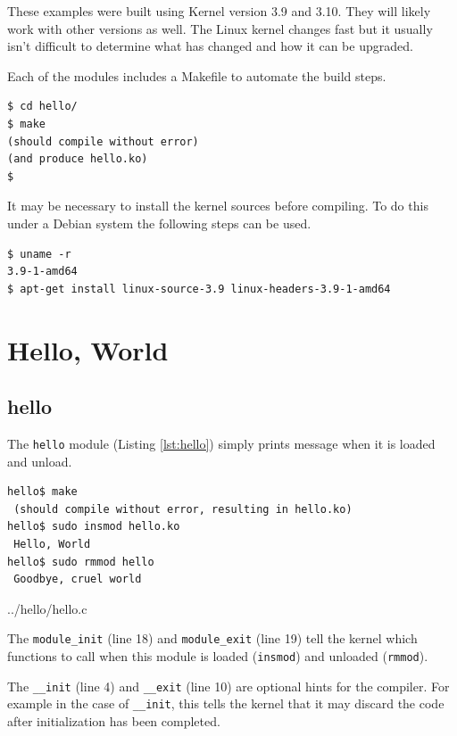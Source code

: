 \documentclass{article}
\begin{document}
These examples were built using Kernel version 3.9 and 3.10.
They will likely work with other versions as well.
The Linux kernel changes fast but it usually isn't difficult to
determine what has changed and how it can be upgraded.

Each of the modules includes a Makefile to automate the build steps.

\begin{verbatim}
$ cd hello/
$ make
(should compile without error)
(and produce hello.ko)
$
\end{verbatim}

It may be necessary to install the kernel sources before compiling.
To do this under a Debian\autocite{debian} system the following steps
can be used.

\begin{verbatim}
$ uname -r
3.9-1-amd64
$ apt-get install linux-source-3.9 linux-headers-3.9-1-amd64

\end{verbatim}


\section{Hello, World}

\subsection{hello}

The \verb+hello+ module (Listing \ref{lst:hello}) simply prints message
when it is loaded and unload.

\begin{verbatim}
hello$ make
 (should compile without error, resulting in hello.ko)
hello$ sudo insmod hello.ko
 Hello, World
hello$ sudo rmmod hello
 Goodbye, cruel world
\end{verbatim}


	{../hello/hello.c}

The \verb+module_init+ (line 18) and \verb+module_exit+ (line 19) tell
the kernel which functions to call when this module is
loaded (\verb+insmod+) and unloaded (\verb+rmmod+).

The \verb+__init+ (line 4) and \verb+__exit+ (line 10)
are optional hints for the compiler.  For example in the case of
\verb+__init+, this tells the kernel that it may discard the code
after initialization has been completed.
\end{document}
